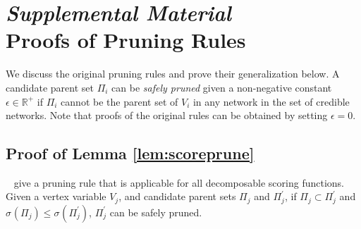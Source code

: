 \documentclass[letterpaper]{article}
\newcommand{\graph}{\mathit{G}}
\newcommand{\vertex}[1]{V_{#1}}
\newcommand{\score}[2]{\sigma_{#1}({#2})}
\newenvironment{customthm}[1]
  {\renewcommand\theinnercustomthm{#1}\innercustomthm}
  {\endinnercustomthm}
\begin{document}



\newpage
\clearpage

\appendix
\section{\textit{Supplemental Material}\\Proofs of Pruning Rules}

We discuss the original pruning rules and prove their generalization below. A candidate parent set $\Pi_i$ can be \textit{safely pruned} given a non-negative constant $\epsilon \in \mathbb{R}^+$ if $\Pi_i$ cannot be the parent set of $V_i$ in any network in the set of credible networks. Note that proofs of the original rules can be obtained by setting $\epsilon=0$.

\subsection{Proof of Lemma \ref{lem:scoreprune}}

\citeauthor{TeyssierK05}~ give a pruning rule that is applicable for all decomposable scoring functions.
\begin{customthm}{1A}\cite{TeyssierK05}
	Given a vertex variable $\vertex{j}$, and candidate parent sets
	$\Pi_j$ and  $\Pi_j^{\prime}$, if $\Pi_j \subset \Pi_j^{\prime}$ and $\score{}{\Pi_j} \leq \score{}{\Pi_j^{\prime}}$,
	$\Pi_j^{\prime}$ can be safely pruned. \label{thm:basicrule}
\end{customthm}


\end{document}

